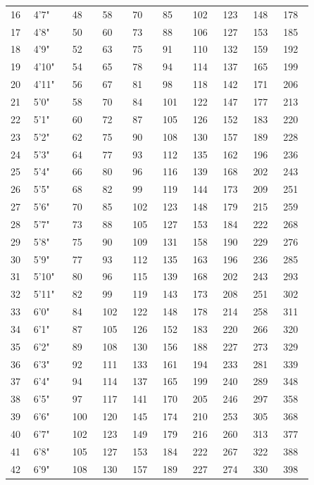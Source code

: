 \begin{multicols*}{2}
\begin{tcolorbox}[breakable,boxrule=0pt]
\begin{tabular}{ p{0.03\linewidth} p{0.07\linewidth} p{0.05\linewidth} p{0.05\linewidth} p{0.05\linewidth} p{0.05\linewidth} p{0.05\linewidth} p{0.05\linewidth} p{0.05\linewidth} p{0.05\linewidth} }
16 & 4'7" & 48 & 58 & 70 & 85 & 102 & 123 & 148 & 178\\
17 & 4'8" & 50 & 60 & 73 & 88 & 106 & 127 & 153 & 185\\
18 & 4'9" & 52 & 63 & 75 & 91 & 110 & 132 & 159 & 192\\
19 & 4'10" & 54 & 65 & 78 & 94 & 114 & 137 & 165 & 199\\
20 & 4'11" & 56 & 67 & 81 & 98 & 118 & 142 & 171 & 206\\
21 & 5'0" & 58 & 70 & 84 & 101 & 122 & 147 & 177 & 213\\
22 & 5'1" & 60 & 72 & 87 & 105 & 126 & 152 & 183 & 220\\
23 & 5'2" & 62 & 75 & 90 & 108 & 130 & 157 & 189 & 228\\
24 & 5'3" & 64 & 77 & 93 & 112 & 135 & 162 & 196 & 236\\
25 & 5'4" & 66 & 80 & 96 & 116 & 139 & 168 & 202 & 243\\
26 & 5'5" & 68 & 82 & 99 & 119 & 144 & 173 & 209 & 251\\
27 & 5'6" & 70 & 85 & 102 & 123 & 148 & 179 & 215 & 259\\
28 & 5'7" & 73 & 88 & 105 & 127 & 153 & 184 & 222 & 268\\
29 & 5'8" & 75 & 90 & 109 & 131 & 158 & 190 & 229 & 276\\
30 & 5'9" & 77 & 93 & 112 & 135 & 163 & 196 & 236 & 285\\
31 & 5'10" & 80 & 96 & 115 & 139 & 168 & 202 & 243 & 293\\
32 & 5'11" & 82 & 99 & 119 & 143 & 173 & 208 & 251 & 302\\
33 & 6'0" & 84 & 102 & 122 & 148 & 178 & 214 & 258 & 311\\
34 & 6'1" & 87 & 105 & 126 & 152 & 183 & 220 & 266 & 320\\
35 & 6'2" & 89 & 108 & 130 & 156 & 188 & 227 & 273 & 329\\
36 & 6'3" & 92 & 111 & 133 & 161 & 194 & 233 & 281 & 339\\
37 & 6'4" & 94 & 114 & 137 & 165 & 199 & 240 & 289 & 348\\
38 & 6'5" & 97 & 117 & 141 & 170 & 205 & 246 & 297 & 358\\
39 & 6'6" & 100 & 120 & 145 & 174 & 210 & 253 & 305 & 368\\
40 & 6'7" & 102 & 123 & 149 & 179 & 216 & 260 & 313 & 377\\
41 & 6'8" & 105 & 127 & 153 & 184 & 222 & 267 & 322 & 388\\
42 & 6'9" & 108 & 130 & 157 & 189 & 227 & 274 & 330 & 398\\

\end{tabular}
\end{tcolorbox}
\end{multicols*}
